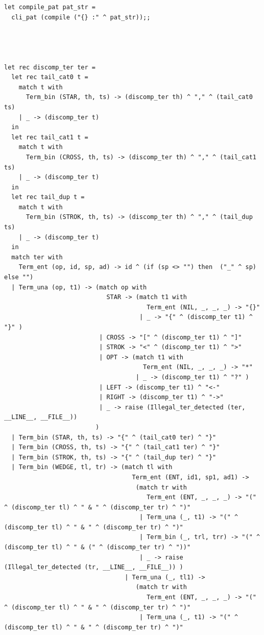 \documentclass[12pt]{article}
\begin{document}
\begin{tiny}
\begin{verbatim}
let compile_pat pat_str =
  cli_pat (compile ("{} :" ^ pat_str));;




let rec discomp_ter ter =
  let rec tail_cat0 t =
    match t with
      Term_bin (STAR, th, ts) -> (discomp_ter th) ^ "," ^ (tail_cat0 ts)
    | _ -> (discomp_ter t)
  in
  let rec tail_cat1 t =
    match t with
      Term_bin (CROSS, th, ts) -> (discomp_ter th) ^ "," ^ (tail_cat1 ts)
    | _ -> (discomp_ter t)
  in
  let rec tail_dup t =
    match t with
      Term_bin (STROK, th, ts) -> (discomp_ter th) ^ "," ^ (tail_dup ts)
    | _ -> (discomp_ter t)
  in
  match ter with
    Term_ent (op, id, sp, ad) -> id ^ (if (sp <> "") then  ("_" ^ sp) else "")
  | Term_una (op, t1) -> (match op with
                            STAR -> (match t1 with
                                       Term_ent (NIL, _, _, _) -> "{}"
                                     | _ -> "{" ^ (discomp_ter t1) ^ "}" )
                          | CROSS -> "[" ^ (discomp_ter t1) ^ "]"
                          | STROK -> "<" ^ (discomp_ter t1) ^ ">"
                          | OPT -> (match t1 with
                                      Term_ent (NIL, _, _, _) -> "*"
                                    | _ -> (discomp_ter t1) ^ "?" )
                          | LEFT -> (discomp_ter t1) ^ "<-"
                          | RIGHT -> (discomp_ter t1) ^ "->"
                          | _ -> raise (Illegal_ter_detected (ter, __LINE__, __FILE__))
                         )
  | Term_bin (STAR, th, ts) -> "{" ^ (tail_cat0 ter) ^ "}"
  | Term_bin (CROSS, th, ts) -> "{" ^ (tail_cat1 ter) ^ "}"
  | Term_bin (STROK, th, ts) -> "{" ^ (tail_dup ter) ^ "}"
  | Term_bin (WEDGE, tl, tr) -> (match tl with
                                   Term_ent (ENT, id1, sp1, ad1) ->
                                    (match tr with
                                       Term_ent (ENT, _, _, _) -> "(" ^ (discomp_ter tl) ^ " & " ^ (discomp_ter tr) ^ ")"
                                     | Term_una (_, t1) -> "(" ^ (discomp_ter tl) ^ " & " ^ (discomp_ter tr) ^ ")"
                                     | Term_bin (_, trl, trr) -> "(" ^ (discomp_ter tl) ^ " & (" ^ (discomp_ter tr) ^ "))"
                                     | _ -> raise (Illegal_ter_detected (tr, __LINE__, __FILE__)) )
                                 | Term_una (_, tl1) ->
                                    (match tr with
                                       Term_ent (ENT, _, _, _) -> "(" ^ (discomp_ter tl) ^ " & " ^ (discomp_ter tr) ^ ")"
                                     | Term_una (_, t1) -> "(" ^ (discomp_ter tl) ^ " & " ^ (discomp_ter tr) ^ ")"

\end{verbatim}
\end{tiny}
\end{document}
